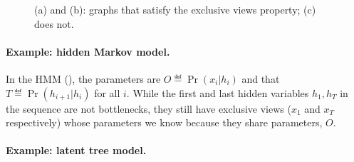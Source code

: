 \begin{figure}
  \centering
  \caption{(a) and (b): graphs that satisfy the exclusive views property; (c) does not.}
  \label{fig:examples}
\end{figure}


\paragraph{Example: hidden Markov model.}

In the HMM (), the parameters
are $O \eqdef \Pr(x_i|h_i)$  and that $T \eqdef \Pr(h_{i+1} | h_i)$
for all $i$. %
While the first and last hidden variables $h_1, h_T$ in the
  sequence are not bottlenecks, they still have exclusive views ($x_1$ and
  $x_T$ respectively) whose parameters we know because they share
  parameters, $O$.

\paragraph{Example: latent tree model.}

